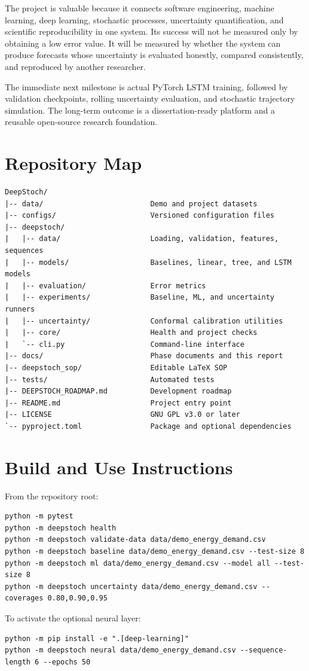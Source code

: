 \documentclass[11pt,a4paper]{report}
\begin{document}
The project is valuable because it connects software engineering, machine learning, deep learning, stochastic processes, uncertainty quantification, and scientific reproducibility in one system. Its success will not be measured only by obtaining a low error value. It will be measured by whether the system can produce forecasts whose uncertainty is evaluated honestly, compared consistently, and reproduced by another researcher.

The immediate next milestone is actual PyTorch LSTM training, followed by validation checkpoints, rolling uncertainty evaluation, and stochastic trajectory simulation. The long-term outcome is a dissertation-ready platform and a reusable open-source research foundation.

\appendix
\chapter{Repository Map}
\begin{lstlisting}
DeepStoch/
|-- data/                         Demo and project datasets
|-- configs/                      Versioned configuration files
|-- deepstoch/
|   |-- data/                     Loading, validation, features, sequences
|   |-- models/                   Baselines, linear, tree, and LSTM models
|   |-- evaluation/               Error metrics
|   |-- experiments/              Baseline, ML, and uncertainty runners
|   |-- uncertainty/              Conformal calibration utilities
|   |-- core/                     Health and project checks
|   `-- cli.py                    Command-line interface
|-- docs/                         Phase documents and this report
|-- deepstoch_sop/                Editable LaTeX SOP
|-- tests/                        Automated tests
|-- DEEPSTOCH_ROADMAP.md          Development roadmap
|-- README.md                     Project entry point
|-- LICENSE                       GNU GPL v3.0 or later
`-- pyproject.toml                Package and optional dependencies
\end{lstlisting}

\chapter{Build and Use Instructions}
From the repository root:
\begin{lstlisting}
python -m pytest
python -m deepstoch health
python -m deepstoch validate-data data/demo_energy_demand.csv
python -m deepstoch baseline data/demo_energy_demand.csv --test-size 8
python -m deepstoch ml data/demo_energy_demand.csv --model all --test-size 8
python -m deepstoch uncertainty data/demo_energy_demand.csv --coverages 0.80,0.90,0.95
\end{lstlisting}

To activate the optional neural layer:
\begin{lstlisting}
python -m pip install -e ".[deep-learning]"
python -m deepstoch neural data/demo_energy_demand.csv --sequence-length 6 --epochs 50
\end{lstlisting}
\end{document}
